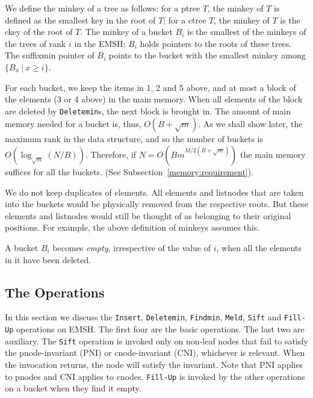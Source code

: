 We define the minkey of a tree as follows:
for a ptree $T$, the minkey of $T$ is defined as the 
	smallest key in the root of $T$;
for a ctree $T$, the minkey of $T$ is the ckey of the root of $T$.
The minkey of a bucket $B_{i}$ is the smallest of the minkeys of the trees of rank $i$ in the EMSH;
	$B_{i}$ holds pointers to the roots of these trees.  
The suffixmin pointer of $B_{i}$ points to the bucket with the smallest minkey
	among $\{B_{x}\ |\ x\geq i\}$.  

For each bucket, we keep the items in 1, 2 and 5 above, and at most a block of the elements 
	(3 or 4 above) in the main memory.
When all elements of the block are deleted by {\tt Deletemin}s, the next 
	block is brought in.
The amount of main memory needed for a bucket is, thus, $O(B+\sqrt{m})$. 
As we shall show later, the maximum rank in the data structure, and so the number
	of buckets is $O(\log_{\sqrt{m}} (N/B))$. Therefore, if 
	$N = O(B m^{M/2(B + \sqrt{m})})$ 
	the main memory suffices for all the buckets.
(See Subsection~\ref{memory:requirement}). 

We do not keep duplicates of elements. 
All elements and listnodes that are taken into the buckets would be 
	physically removed from the respective roots.
But these elements and listnodes would still be thought of as belonging to their
	original positions.
For example, the above definition of minkeys assumes this.

A bucket $B_i$ becomes {\em empty}, irrespective of the value of $i$,
when all the elements in it have been deleted. 

	



\subsection{The Operations}

In this section we discuss the {\tt Insert}, {\tt Deletemin}, {\tt Findmin}, {\tt Meld}, {\tt Sift} and {\tt Fill-Up} 
    operations on EMSH. The first four are the basic operations. 
The last two are auxiliary.
The {\tt Sift} operation is invoked only on non-leaf nodes that fail to satisfy the 
	pnode-invariant (PNI) or cnode-invariant (CNI), whichever is relevant.
When the invocation returns, the node will satisfy the invariant.
Note that PNI applies to pnodes and CNI applies to cnodes. 
{\tt Fill-Up} is invoked by the other operations on a bucket when they find it empty.

